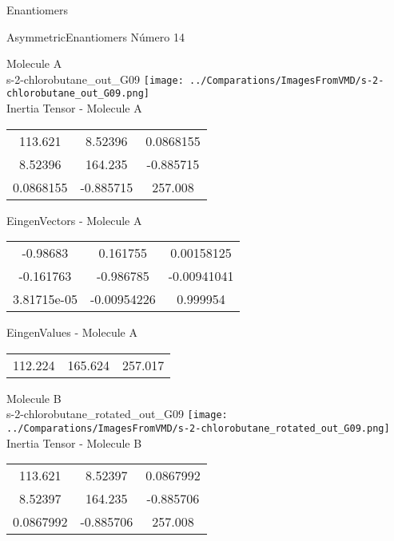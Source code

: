 \begin{center}
\vtab
\vtab
\textcolor{NavyBlue}{\Large Enantiomers}
\end{center}

 \newpage

\vtab[-2cm]
\begin{center}
{\large AsymmetricEnantiomers \tab Número 14}
\end{center}
\begin{multicols}{2}
\begin{center}

Molecule A \\ 
s-2-chlorobutane\_out\_G09
\texttt{[image: ../Comparations/ImagesFromVMD/s-2-chlorobutane\_out\_G09.png]}
\\
Inertia Tensor - Molecule A \\
\vtab

\begin{tabular}{|c c c|}
113.621	 & 	8.52396	 & 	0.0868155	 \\
8.52396	 & 	164.235	 & 	-0.885715	 \\
0.0868155	 & 	-0.885715	 & 	257.008
\end{tabular}

\vtab
 EingenVectors - Molecule A     \\
\vtab
\begin{tabular}{|c c c|}
-0.98683	 & 	0.161755	 & 	0.00158125	 \\
-0.161763	 & 	-0.986785	 & 	-0.00941041	 \\
3.81715e-05	 & 	-0.00954226	 & 	0.999954
\end{tabular}

\vtab
 EingenValues - Molecule A     \\
\vtab
\begin{tabular}{|c c c|}
112.224	 & 	165.624	 & 	257.017	 \\
\end{tabular}
\columnbreak

Molecule B \\ 
s-2-chlorobutane\_rotated\_out\_G09
\texttt{[image: ../Comparations/ImagesFromVMD/s-2-chlorobutane\_rotated\_out\_G09.png]}
\\
Inertia Tensor - Molecule B \\
\vtab

\begin{tabular}{|c c c|}
113.621	 & 	8.52397	 & 	0.0867992	 \\
8.52397	 & 	164.235	 & 	-0.885706	 \\
0.0867992	 & 	-0.885706	 & 	257.008
\end{tabular}


\end{center}
\end{multicols}
